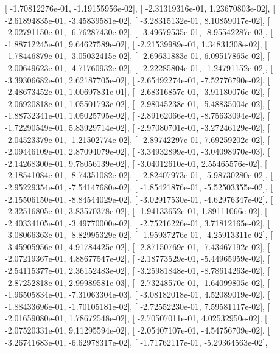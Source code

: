 \documentclass{article}
\begin{document}
       [ -1.70812276e-01,  -1.19155956e-02],
       [ -2.31319316e-01,   1.23670803e-02],
       [ -2.61894835e-01,  -3.45839581e-02],
       [ -3.28315132e-01,   8.10859017e-02],
       [ -2.02791150e-01,  -6.76287430e-02],
       [ -3.49679535e-01,  -8.95542287e-03],
       [ -1.88712245e-01,   9.64627589e-02],
       [ -2.21539989e-01,   1.34831308e-02],
       [ -1.78446879e-01,  -3.05032415e-02],
       [ -2.69631883e-01,   6.09517865e-02],
       [ -2.00649623e-01,  -4.71760932e-02],
       [ -2.22285804e-01,  -1.24791152e-02],
       [ -3.39306682e-01,   2.62187705e-02],
       [ -2.65492274e-01,  -7.52776790e-02],
       [ -2.48673452e-01,   1.00697831e-01],
       [ -2.68316857e-01,  -3.91180076e-02],
       [ -2.06920818e-01,   1.05501793e-02],
       [ -2.98045238e-01,  -5.48835004e-02],
       [ -1.88732341e-01,   1.05025795e-02],
       [ -2.89162066e-01,  -8.75633094e-02],
       [ -1.72290549e-01,   5.83929714e-02],
       [ -2.97080701e-01,  -3.27246129e-02],
       [ -2.04523379e-01,  -1.21502774e-02],
       [ -2.89742297e-01,   7.69259202e-02],
       [ -2.09446109e-01,   2.87094079e-02],
       [ -3.34932899e-01,  -3.04098970e-03],
       [ -2.14268300e-01,   9.78056139e-02],
       [ -3.04012610e-01,   2.55465576e-02],
       [ -2.18541084e-01,  -8.74351082e-02],
       [ -2.82407973e-01,  -5.98730280e-02],
       [ -2.95229354e-01,  -7.54147680e-02],
       [ -1.85421876e-01,  -5.52503355e-02],
       [ -2.15506150e-01,  -8.84544029e-02],
       [ -3.02917530e-01,  -4.62976347e-02],
       [ -2.32516805e-01,   3.83570378e-02],
       [ -1.94133652e-01,   1.89111066e-02],
       [ -2.40334105e-01,  -3.49770000e-02],
       [ -2.75216226e-01,   3.71812165e-02],
       [ -3.08066363e-01,  -8.82995329e-02],
       [ -1.95937276e-01,  -4.25913311e-02],
       [ -3.45905956e-01,   4.91784425e-02],
       [ -2.87150769e-01,  -7.43467192e-02],
       [ -2.07219367e-01,   4.88677547e-02],
       [ -2.18773529e-01,  -5.44965959e-02],
       [ -2.54115377e-01,   2.36152483e-02],
       [ -3.25981848e-01,  -8.78614263e-02],
       [ -2.87252818e-01,   2.99989581e-03],
       [ -2.73248570e-01,  -1.64099805e-02],
       [ -1.96505834e-01,  -7.31063304e-03],
       [ -3.08182018e-01,   4.52089019e-02],
       [ -1.88433696e-01,  -1.70105181e-02],
       [ -2.72552230e-01,   7.59581117e-02],
       [ -2.01659080e-01,   1.78672548e-02],
       [ -2.70507011e-01,   4.02532950e-02],
       [ -2.07520331e-01,   9.11295594e-02],
       [ -2.05407107e-01,  -4.54756709e-02],
       [ -3.26741683e-01,  -6.62978317e-02],
       [ -1.71762117e-01,  -5.29364563e-02],
\end{document}
